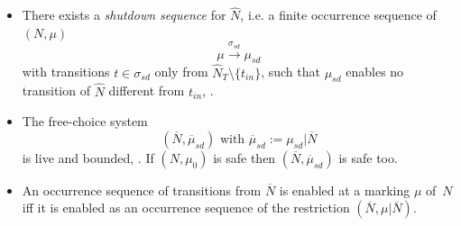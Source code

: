 \documentclass{fundam}
\begin{document}
\begin{remark}
\begin{enumerate}
\begin{itemize}
\item There exists a \emph{shutdown sequence} for $\hat{N}$, i.e. a finite occurrence sequence \mbox{of $(N,\mu)$}
$$\mu \xrightarrow{\sigma_{sd}} \mu_{sd}$$
with transitions $t\in \sigma_{sd}$ only from $\hat{N}_T\setminus \{t_{in}\}$, such that $\mu_{sd}$ enables no transition of $\hat{N}$ different from $t_{in}$, \cite[Prop. 7.8]{DE1995}.

\item The free-choice system
$$(\overline{N},\overline{\mu}_{sd}) \text{ with } \overline{\mu}_{sd}:=\mu_{sd}|\overline{N}$$
is live and bounded, \cite[Prop. 7.8]{DE1995}. If $(N,\mu_0)$ is safe then $(\overline{N},\overline{\mu}_{sd})$ is safe too.

\item An occurrence sequence of transitions from $\overline{N}$ is enabled at a marking $\mu$ \mbox{of $N$} iff it is enabled as an occurrence sequence of  the restriction $(\overline{N},\mu|\overline{N})$.
\end{itemize}
\end{enumerate}
\end{remark}
\end{document}
